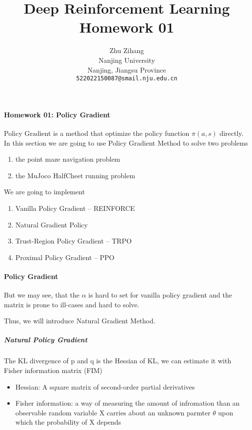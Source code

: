 \documentclass{article}
\title{Deep Reinforcement Learning Homework 01}
\author{
    \hspace{1mm}Zhu Zihang \\
    Nanjing University\\
    Nanjing, Jiangsu Province\\
    \texttt{522022150087@smail.nju.edu.cn}
}
\begin{document}
\maketitle

\paragraph{Homework 01: Policy Gradient }

Policy Gradient is a method 
that optimize the policy function $\pi(a,s)$ directly.
In this section we are going to use Policy Gradient Method to 
solve two problems 

\begin{enumerate}
    \item the point maze navigation problem
    \item the MuJoco HalfCheet running problem
\end{enumerate}

We are going to implement 

\begin{enumerate}
    \item Vanilla Policy Gradient -- REINFORCE
    \item Natural Gradient Policy
    \item Trust-Region Policy Gradient -- TRPO 
    \item Proximal Policy Gradient -- PPO
\end{enumerate}

\paragraph{Policy Gradient}



But we may see, that the $\alpha$ is hard to set for vanilla policy gradient 
and the matrix is prone to ill-cases and hard to solve. 

Thus, we will introduce Natural Gradient Method.

\subparagraph{Natural Policy Gradient}



The KL divergence of p and q is the Hessian of KL, we can estimate it with Fisher information matrix (FIM)

\begin{itemize}
\item Hessian: A square matrix of second-order partial derivatives
\item Fisher information: a way of measuring the amount of infromation than an observable random variable X carries about an unknown parmter $\theta$ upon which the probability of X depends
\end{itemize}
\end{document}
